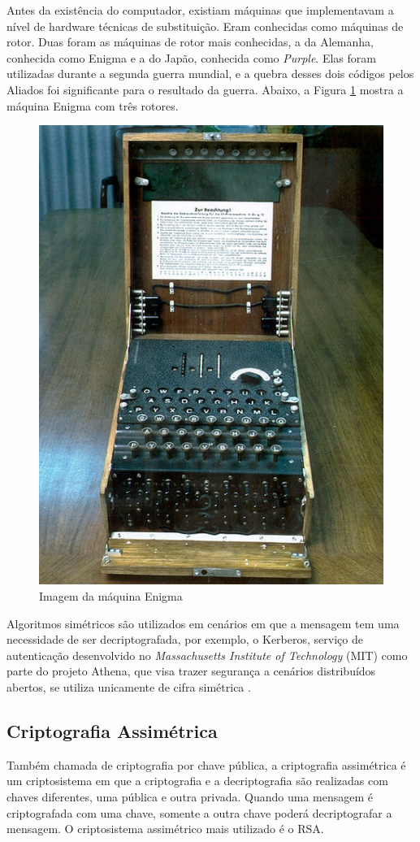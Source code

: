 Antes da existência do computador, existiam máquinas que implementavam a nível de hardware técnicas de substituição. Eram conhecidas como máquinas de rotor. Duas foram as máquinas de rotor mais conhecidas, a da Alemanha, conhecida como Enigma e a do Japão, conhecida como \textit{Purple}. Elas foram utilizadas durante a segunda guerra mundial, e a quebra desses dois códigos pelos Aliados foi significante para o resultado da guerra. Abaixo, a Figura \ref{fig:maqenigma} mostra a máquina Enigma com três rotores.

\begin{figure}[H]
    \centering
    \caption{Imagem da máquina Enigma}
    \label{fig:maqenigma}
    \includegraphics[width=.35\linewidth]{Figuras/MaqEnigma.jpg}
\end{figure}

Algoritmos simétricos são utilizados em cenários em que a mensagem tem uma necessidade de ser decriptografada, por exemplo, o Kerberos, serviço de autenticação desenvolvido no \textit{Massachusetts Institute of Technology} (MIT) como parte do projeto Athena, que visa trazer segurança a cenários distribuídos abertos, se utiliza unicamente de cifra simétrica \cite{stallings14} \cite{tanenbaum03}.

\subsection{Criptografia Assimétrica}
\label{subsec:criptografiaasync}
Também chamada de criptografia por chave pública, a criptografia assimétrica é um criptosistema em que a criptografia e a decriptografia são realizadas com chaves diferentes, uma pública e outra privada. Quando uma mensagem é criptografada com uma chave, somente a outra chave poderá decriptografar  a mensagem. O criptosistema assimétrico mais utilizado é o RSA.

